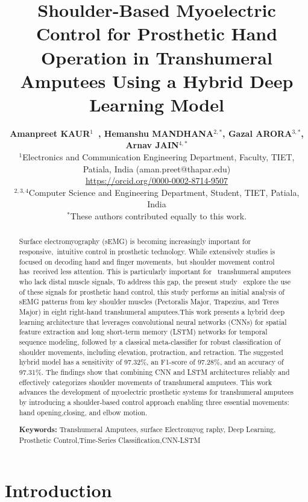 \documentclass{elektr}
\title{
	Shoulder-Based Myoelectric Control for Prosthetic Hand Operation in Transhumeral Amputees Using a Hybrid Deep Learning Model }
\author[KAUR et al.]{
	\textbf{Amanpreet KAUR$^{1}$~, Hemanshu MANDHANA$^{2,*}$, Gazal ARORA$^{3,*}$, Arnav JAIN$^{4,*}$}\\

	$^{1}$Electronics and Communication Engineering Department, Faculty, TIET, Patiala, India (aman.preet@thapar.edu)\\ 	\url{https://orcid.org/0000-0002-8714-9507} \\
	$^{2,3,4}$Computer Science and Engineering Department, Student, TIET, Patiala, India\\
	$^{*}$These authors contributed equally to this work.\\

	\rec{...}
	\acc{...}
	\finv{...}
}
\begin{document}
\maketitle

\begin{abstract} Surface electromyography (sEMG) is becoming increasingly important for responsive, intuitive control in prosthetic technology. While extensively studies is focused on decoding hand and finger movements, but shoulder movement control has received less attention.  This is particularly important for  transhumeral amputees who lack distal muscle signals, To address this gap, the present study  explore the use of these signals for prosthetic hand control, this study performs an initial analysis of sEMG patterns from key shoulder muscles (Pectoralis Major, Trapezius, and Teres Major) in eight right-hand transhumeral amputees.This work presents a hybrid deep learning architecture that leverages convolutional neural networks (CNNs) for spatial feature extraction and long short-term memory (LSTM) networks for temporal sequence modeling, followed by a classical meta-classifier for robust classification of shoulder movements, including elevation, protraction, and retraction. The suggested hybrid model has a sensitivity of 97.32\%, an F1-score of 97.28\%, and an accuracy of 97.31\%. The findings show that combining CNN and LSTM architectures reliably and effectively categorizes shoulder movements of transhumeral amputees. This work advances the development of myoelectric prosthetic systems for transhumeral amputees by introducing a shoulder-based control approach enabling three essential movements: hand opening,closing, and elbow motion.
 
 
 \newcommand{\keywords}[1]{\textbf{Keywords:} #1}
\keywords{Transhumeral Amputees, surface Electromyog­ raphy, Deep Learning, Prosthetic Control,Time-Series Classifica­tion,CNN-LSTM}
\end{abstract}

\section{Introduction}
\label{Int}
\end{document}

